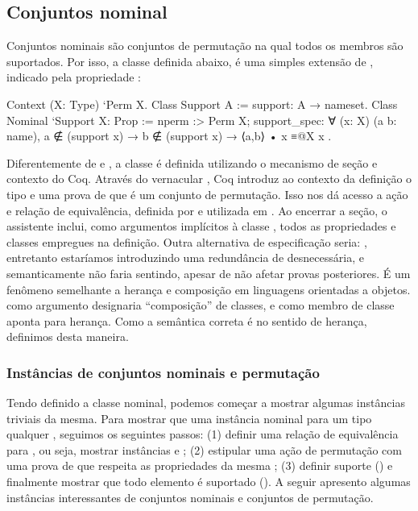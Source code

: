 \subsection{Conjuntos nominal}
Conjuntos nominais são conjuntos de permutação na qual todos os membros são suportados. Por isso, a classe  definida abaixo, é uma simples extensão de , indicado pela propriedade :
\begin{coqcode}
Context (X: Type) `{Perm X}.
Class Support A := support: A → nameset.
Class Nominal `{Support X}: Prop := {
   nperm :> Perm X;
   support_spec: ∀ (x: X) (a b: name),
      a ∉ (support x) → b ∉ (support x) → ⟨a,b⟩ • x ≡@{X} x
}.
\end{coqcode}
Diferentemente de  e , a classe  é definida utilizando o mecanismo de seção e contexto do Coq. Através do vernacular , Coq introduz ao contexto da definição o tipo  e uma prova de que é um conjunto de permutação. Isso nos dá acesso a ação e relação de equivalência, definida por  e utilizada em . Ao encerrar a seção, o assistente inclui, como argumentos implícitos à classe , todos as propriedades e classes empregues na definição.
Outra alternativa de especificação seria: , entretanto estaríamos introduzindo uma redundância de  desnecessária, e semanticamente não faria sentindo, apesar de não afetar provas posteriores. É um fenômeno semelhante a herança e composição em linguagens orientadas a objetos.  como argumento designaria ``composição'' de classes, e como membro de classe aponta para herança. Como a semântica correta é no sentido de herança, definimos desta maneira.

\subsubsection{Instâncias de conjuntos nominais e permutação}
Tendo definido a classe nominal, podemos começar a mostrar algumas instâncias triviais da mesma. Para mostrar que uma instância nominal para um tipo qualquer , seguimos os seguintes passos: (1) definir uma relação de equivalência para , ou seja, mostrar instâncias  e ; (2) estipular uma ação de permutação  com uma prova de que respeita as propriedades da mesma ; (3) definir suporte () e finalmente mostrar que todo elemento é suportado (). A seguir apresento algumas instâncias interessantes de conjuntos nominais e conjuntos de permutação.

